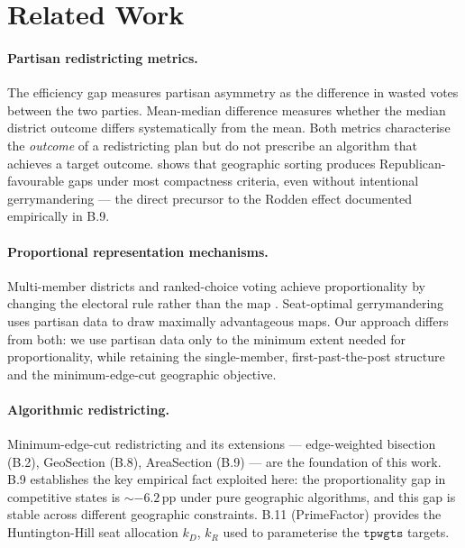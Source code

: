 \section{Related Work}
\label{sec:related}

\paragraph{Partisan redistricting metrics.}
The efficiency gap \citep{stephanopoulos2015} measures partisan asymmetry as
the difference in wasted votes between the two parties.
Mean-median difference \citep{mcdonald2015} measures whether the median district
outcome differs systematically from the mean.
Both metrics characterise the \emph{outcome} of a redistricting plan but do
not prescribe an algorithm that achieves a target outcome.
\citet{mcghee2014} shows that geographic sorting produces Republican-favourable
gaps under most compactness criteria, even without intentional gerrymandering ---
the direct precursor to the Rodden effect documented empirically in B.9.

\paragraph{Proportional representation mechanisms.}
Multi-member districts and ranked-choice voting achieve proportionality by
changing the electoral rule rather than the map \citep{lijphart1994}.
Seat-optimal gerrymandering \citep{chen2013, friedman2009} uses partisan data
to draw maximally advantageous maps.
Our approach differs from both: we use partisan data only to the minimum extent
needed for proportionality, while retaining the single-member, first-past-the-post
structure and the minimum-edge-cut geographic objective.

\paragraph{Algorithmic redistricting.}
Minimum-edge-cut redistricting \citep{karypis1998, b1paper} and its extensions
--- edge-weighted bisection (B.2), GeoSection (B.8), AreaSection (B.9) ---
are the foundation of this work.
B.9 establishes the key empirical fact exploited here: the proportionality
gap in competitive states is $\sim$$-6.2$\,pp under pure geographic algorithms,
and this gap is stable across different geographic constraints.
B.11 (PrimeFactor) provides the Huntington-Hill seat allocation $k_D$, $k_R$
used to parameterise the $\mathtt{tpwgts}$ targets.

